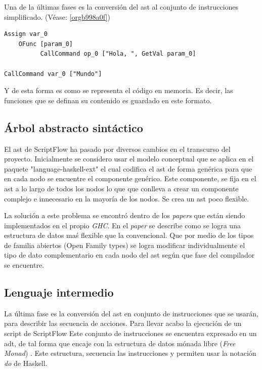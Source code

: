 \documentclass[11pt]{article}
\begin{document}
Una de la últimas fases es la conversión del \gls{ast} al conjunto de
instrucciones simplificado. (Véase: \ref{orgb998a0f})

\begin{verbatim}
Assign var_0
    OFunc [param_0]
          CallCommand op_0 ["Hola, ", GetVal param_0]

CallCommand var_0 ["Mundo"]
\end{verbatim}

Y de esta forma es como se representa el código en memoria. Es decir, las
funciones que se definan su contenido es guardado en este formato.

\subsection{Árbol abstracto sintáctico}
\label{sec:orgcd44e3d}

El \gls{ast} de ScriptFlow ha pasado por diversos cambios en el transcurso del proyecto. Inicialmente
se considero usar el modelo conceptual que se aplica en el paquete "language-haskell-ext" el cual codifica el \gls{ast} de forma genérica
para que en cada nodo se encuentre el componente genérico. Este componente, se fija en el \gls{ast} a lo largo de todos los nodos lo que
que conlleva a crear un componente complejo e innecesario en la mayoría de los nodos. Se crea un \gls{ast} poco flexible.

La solución a este problema se encontró dentro de los \emph{papers} que están siendo implementados en el propio \emph{GHC}. En el \emph{paper} \cite{shayan-2017-trees}
se describe como se logra una estructura de datos maś flexible que la convencional. Que por medio de los tipos de familia abiertos (Open Family types)
se logra modificar individualmente el tipo de dato complementario en cada nodo del \gls{ast} según que fase del compilador se encuentre.

\subsection{Lenguaje intermedio}
\label{sec:org4d9f88c}

\label{orgb998a0f} La última fase es la conversión del \gls{ast} en conjunto de instrucciones
que se usarán, para describir las secuencia de acciones. Para llevar acabo la ejecución de un script de ScriptFlow
Este conjunto de instrucciones se encuentra expresado en un \gls{adt}, de tal forma que encaje con la estructura
de datos mónada libre (\emph{Free Monad}) \cite{free-monads}. Este estructura, secuencia las instrucciones y permiten usar la notación \emph{do} de Haskell.
\end{document}
